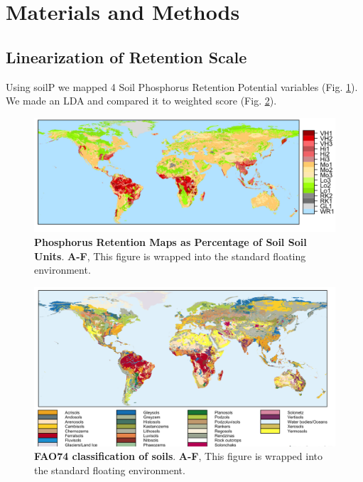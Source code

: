 \documentclass[10pt,letterpaper]{article}
\begin{document}
\section*{Materials and Methods}
\subsection*{Linearization of Retention Scale}
Using soilP we mapped 4 Soil Phosphorus Retention Potential variables (Fig. \ref{fig0}).
We made an LDA and compared it to weighted score (Fig. \ref{fig1}).
\begin{figure}[p] %


\includegraphics[width=\textwidth]{fig0.png}

\caption{\color{Gray} \textbf{Phosphorus Retention Maps as Percentage of Soil Soil Units}. \textbf{A-F}, This figure is wrapped into the standard floating environment.}

\label{fig0} %

\end{figure}


\begin{figure}[h] %


\includegraphics[width=\textwidth]{fig1.png}

\caption{\color{Gray} \textbf{FAO74 classification  of soils}. \textbf{A-F}, This figure is wrapped into the standard floating environment.}

\label{fig1} %

\end{figure}
\end{document}
